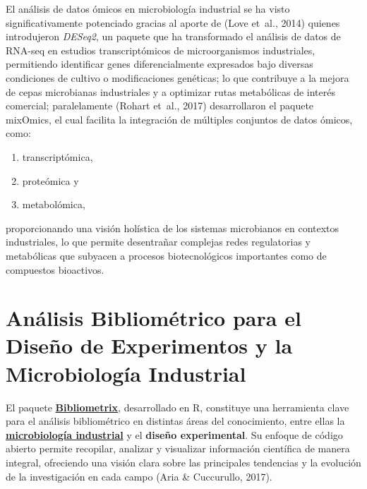 \documentclass[
  spanish,
  letterpaper,
  DIV=11,
  numbers=noendperiod]{scrreprt}
\providecommand{\tightlist}{%
  \setlength{\itemsep}{0pt}\setlength{\parskip}{0pt}}
\begin{document}
\begin{tcolorbox}[enhanced jigsaw, titlerule=0mm, arc=.35mm, rightrule=.15mm, bottomrule=.15mm, leftrule=.75mm, colbacktitle=quarto-callout-caution-color!10!white, colframe=quarto-callout-caution-color-frame, coltitle=black, opacityback=0, colback=white, toptitle=1mm, opacitybacktitle=0.6, toprule=.15mm, bottomtitle=1mm, title=\textcolor{quarto-callout-caution-color}{\faFire}\hspace{0.5em}{Expandir para aprender son el analis de datos ómicos}, left=2mm, breakable]

El análisis de datos ómicos en microbiología industrial se ha visto
significativamente potenciado gracias al aporte de (Love et~al., 2014)
quienes introdujeron \emph{DESeq2}, un paquete que ha transformado el
análisis de datos de RNA-seq en estudios transcriptómicos de
microorganismos industriales, permitiendo identificar genes
diferencialmente expresados bajo diversas condiciones de cultivo o
modificaciones genéticas; lo que contribuye a la mejora de cepas
microbianas industriales y a optimizar rutas metabólicas de interés
comercial; paralelamente (Rohart et~al., 2017) desarrollaron el paquete
mixOmics, el cual facilita la integración de múltiples conjuntos de
datos ómicos, como:

\begin{enumerate}
\def\labelenumi{(\roman{enumi})}
\tightlist
\item
  transcriptómica,
\item
  proteómica y
\item
  metabolómica,
\end{enumerate}

proporcionando una visión holística de los sistemas microbianos en
contextos industriales, lo que permite desentrañar complejas redes
regulatorias y metabólicas que subyacen a procesos biotecnológicos
importantes como de compuestos bioactivos.

\end{tcolorbox}

\section{Análisis Bibliométrico para el Diseño de Experimentos y la
Microbiología
Industrial}\label{anuxe1lisis-bibliomuxe9trico-para-el-diseuxf1o-de-experimentos-y-la-microbiologuxeda-industrial}

El paquete
\href{https://www.bibliometrix.org/home/}{\textbf{Bibliometrix}},
desarrollado en R, constituye una herramienta clave para el análisis
bibliométrico en distintas áreas del conocimiento, entre ellas la
\href{https://bucaramanga.udes.edu.co/estudia/pregrados/microbiologia-industrial}{\textbf{microbiología
industrial}} y el \textbf{diseño experimental}. Su enfoque de código
abierto permite recopilar, analizar y visualizar información científica
de manera integral, ofreciendo una visión clara sobre las principales
tendencias y la evolución de la investigación en cada campo (Aria \&
Cuccurullo, 2017).
\end{document}

